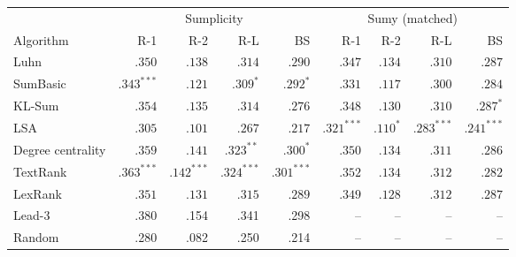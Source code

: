 \begin{tabular}{l r r r r r r r r}
\toprule
 & \multicolumn{4}{c}{Sumplicity} & \multicolumn{4}{c}{Sumy (matched)} \\
\cmidrule(lr){2-5}\cmidrule(lr){6-9}
Algorithm & R-1 & R-2 & R-L & BS & R-1 & R-2 & R-L & BS \\
\midrule
Luhn & $.350$ & $.138$ & $.314$ & $.290$ & $.347$ & $.134$ & $.310$ & $.287$ \\
SumBasic & $\mathbf{.343}^{***}$ & $.121$ & $\mathbf{.309}^{*}$ & $\mathbf{.292}^{*}$ & $.331$ & $.117$ & $.300$ & $.284$ \\
KL-Sum & $.354$ & $.135$ & $.314$ & $.276$ & $.348$ & $.130$ & $.310$ & $\mathbf{.287}^{*}$ \\
LSA & $.305$ & $.101$ & $.267$ & $.217$ & $\mathbf{.321}^{***}$ & $\mathbf{.110}^{*}$ & $\mathbf{.283}^{***}$ & $\mathbf{.241}^{***}$ \\
Degree centrality & $.359$ & $.141$ & $\mathbf{.323}^{**}$ & $\mathbf{.300}^{*}$ & $.350$ & $.134$ & $.311$ & $.286$ \\
TextRank & $\mathbf{.363}^{***}$ & $\mathbf{.142}^{***}$ & $\mathbf{.324}^{***}$ & $\mathbf{.301}^{***}$ & $.352$ & $.134$ & $.312$ & $.282$ \\
LexRank & $.351$ & $.131$ & $.315$ & $.289$ & $.349$ & $.128$ & $.312$ & $.287$ \\
\midrule
Lead-3 & .380 & .154 & .341 & .298 & -- & -- & -- & -- \\
Random & .280 & .082 & .250 & .214 & -- & -- & -- & -- \\
\bottomrule
\end{tabular}

